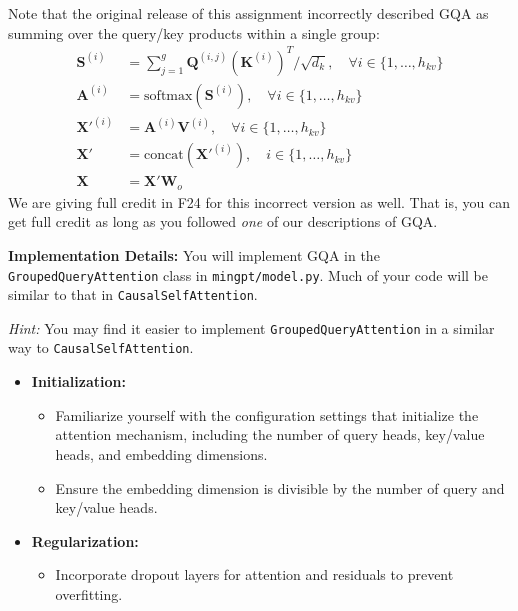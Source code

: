 \documentclass[11pt,addpoints,answers]{exam}
\newcommand{\Av}{\mathbf{A}}
\newcommand{\Kv}{\mathbf{K}}
\newcommand{\Qv}{\mathbf{Q}}
\newcommand{\Sv}{\mathbf{S}}
\newcommand{\Vv}{\mathbf{V}}
\newcommand{\Wv}{\mathbf{W}}
\newcommand{\Xv}{\mathbf{X}}
\begin{document}
\begin{questions}
\begin{parts}
{\small 
    \begin{notebox}
    Note that the original release of this assignment incorrectly described GQA as summing over the query/key products within a single group:
    \begin{align*}
        \Sv^{(i)} &= \sum_{j=1}^{g} \Qv^{(i,j)} (\Kv^{(i)})^T / \sqrt{d_k},  \quad \forall i \in \{1, \ldots, h_{kv} \}\\
        \Av^{(i)} &= \text{softmax}(\Sv^{(i)}), \quad \forall i \in \{1, \ldots, h_{kv} \} \\
        \Xv'^{(i)} &= \Av^{(i)} \Vv^{(i)}, \quad \forall i \in \{1, \ldots, h_{kv} \}\\
        \Xv' &= \text{concat}(\Xv'^{(i)}), \quad  i \in \{1, \ldots, h_{kv} \}\\
        \Xv &= \Xv'\Wv_o
    \end{align*}        
    We are giving full credit in F24 for this incorrect version as well. That is, you can get full credit as long as you followed \emph{one} of our descriptions of GQA.
    \end{notebox}

    \textbf{Implementation Details:}
    You will implement GQA in the \lstinline{GroupedQueryAttention} class in \lstinline{mingpt/model.py}. Much of your code will be similar to that in \lstinline{CausalSelfAttention}. 

    \emph{Hint:} You may find it easier to implement \lstinline{GroupedQueryAttention} in a similar way to \lstinline{CausalSelfAttention}.


    \begin{itemize}
        
    \item \textbf{ Initialization:}
    \begin{itemize}
        \item Familiarize yourself with the configuration settings that initialize the attention mechanism, including the number of query heads, key/value heads, and embedding dimensions.
        \item Ensure the embedding dimension is divisible by the number of query and key/value heads.
    \end{itemize}
    
    \item \textbf{Regularization:}
    \begin{itemize}
        \item Incorporate dropout layers for attention and residuals to prevent overfitting.
    \end{itemize}
    

\end{itemize}}
\end{parts}
\end{questions}
\end{document}
